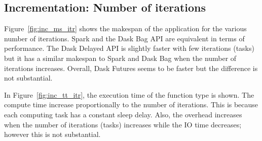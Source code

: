 \documentclass[conference]{IEEEtran}
\begin{document}
\subsection{Incrementation: Number of iterations}
Figure~\ref{fig:inc_ms_itr} shows the makespan of the application for the various
number of iterations. Spark and the Dask Bag API are equivalent in terms of
performance. The Dask Delayed API is slightly faster with few iterations (tasks) but
it has a similar makespan to Spark and Dask Bag when the number of iterations
increases. Overall, Dask Futures seems to be faster but the difference is not
substantial.

In Figure~\ref{fig:inc_tt_itr}, the execution time of the function type is shown. The
compute time increase proportionally to the number of iterations. This is because
each computing task has a constant sleep delay. Also, the overhead increases when the
number of iterations (tasks) increases while the IO time decreases; however this is
not substantial.


\end{document}
